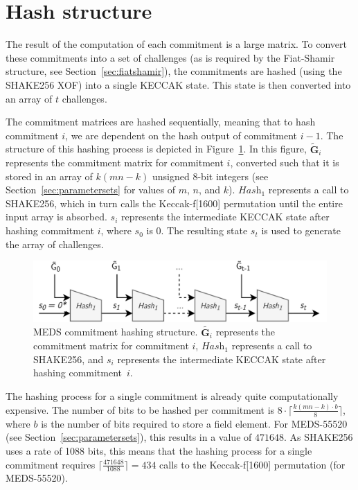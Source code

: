 \documentclass[11pt,a4paper]{report}
\theoremstyle{definition}
\begin{document}
\pagebreak

\section{Hash structure}
\label{sec:hashfunctionoptimization}
The result of the computation of each commitment is a large matrix. To convert these commitments into a set of challenges (as is required by the Fiat-Shamir structure, see Section~\ref{sec:fiatshamir}), the commitments are hashed (using the SHAKE256 XOF) into a single KECCAK state. This state is then converted into an array of $t$ challenges.

The commitment matrices are hashed sequentially, meaning that to hash commitment $i$, we are dependent on the hash output of commitment $i - 1$. The structure of this hashing process is depicted in Figure~\ref{fig:hashstructure}. In this figure, $\tilde{\textbf{G}}_i$ represents the commitment matrix for commitment $i$, converted such that it is stored in an array of $k(mn - k)$ unsigned 8-bit integers (see Section~\ref{sec:parametersets} for values of $m$, $n$, and $k$). $\textit{Hash}_1$ represents a call to SHAKE256, which in turn calls the Keccak-f[1600] permutation until the entire input array is absorbed. $s_i$ represents the intermediate KECCAK state after hashing commitment $i$, where $s_0$ is 0. The resulting state $s_t$ is used to generate the array of challenges.

\begin{figure}
  \centering
  \includegraphics[width=\textwidth]{hash/hash_struct_seq.png}
  \caption{MEDS commitment hashing structure. $\tilde{\textbf{G}_i}$ represents the commitment matrix for commitment $i$, $\textit{Hash}_1$ represents a call to SHAKE256, and $s_i$ represents the intermediate KECCAK state after hashing commitment~$i$.}
  \label{fig:hashstructure}
\end{figure}

The hashing process for a single commitment is already quite computationally expensive. The number of bits to be hashed per commitment is $8 \cdot \lceil \frac{k(mn-k) \cdot b}{8} \rceil$, where $b$ is the number of bits required to store a field element. For MEDS-55520 (see Section~\ref{sec:parametersets}), this results in a value of $471648$. As SHAKE256 uses a rate of 1088 bits, this means that the hashing process for a single commitment requires $\lceil \frac{471648}{1088} \rceil = 434$ calls to the Keccak-f[1600] permutation (for MEDS-55520).
\end{document}
